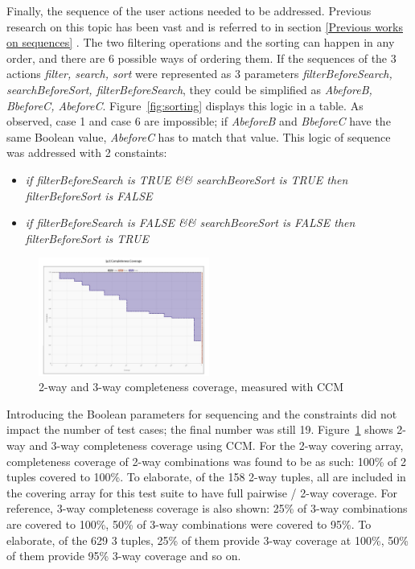 \documentclass[conference]{IEEEtran}
\begin{document}
	Finally, the sequence of the user actions needed to be addressed. Previous research on this topic has been vast and is referred to in section \ref{Previous works on sequences} .
	The two filtering operations and the sorting can happen in any order, and there are 6 possible ways of ordering them.
	If the sequences of the 3 actions \textit{filter, search, sort} were represented as 3 parameters \textit{filterBeforeSearch, searchBeforeSort, filterBeforeSearch}, they could be simplified as \textit{AbeforeB, BbeforeC, AbeforeC}.
	Figure~\ref{fig:sorting} displays this logic in a table.
	As observed, case 1 and case 6 are impossible; if \textit{AbeforeB} and \textit{BbeforeC} have the same Boolean value, \textit{AbeforeC} has to match that value.
	This logic of sequence was addressed with 2 constaints:

	\begin{itemize}
	\item \textit{if filterBeforeSearch is TRUE \&\& searchBeoreSort is TRUE then filterBeforeSort is FALSE}
	\item \textit{if filterBeforeSearch is FALSE \&\& searchBeoreSort is FALSE then filterBeforeSort is TRUE}
	\end{itemize}


	\begin{figure}[!h]
		\includegraphics[width=0.50\textwidth,]{CompletenessCoverage.pdf}
		\caption{2-way and 3-way completeness coverage, measured with CCM}
		\label{fig:CompletenessCoverage}
	\end{figure}


	Introducing the Boolean parameters for sequencing and the constraints did not impact the number of test cases; the final number was still 19.
	Figure~\ref{fig:CompletenessCoverage} shows 2-way and 3-way completeness coverage using CCM. 
	For the 2-way covering array, completeness coverage of 2-way combinations was found to be as such: 100\% of 2 tuples covered to 100\%. 
	To elaborate, of the 158 2-way tuples, all are included in the covering array for this test suite to have full pairwise / 2-way coverage.
	For reference, 3-way completeness coverage is also shown: 25\% of 3-way combinations are covered to 100\%, 50\% of 3-way combinations were covered to 95\%.
	To elaborate, of the 629 3 tuples, 25\% of them provide 3-way coverage at 100\%, 50\% of them provide 95\% 3-way coverage and so on.
\end{document}
